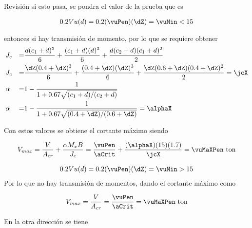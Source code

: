 \documentclass[11pt,a4paper,fleqn]{article}
\begin{document}
 \FPifgt \vuMin \mxZ  {} \else {} \fi
Revisión si esto pasa, se pondra el valor de la prueba que es \pruebaVer
\FPifgt \mxZ \vuMin  
	{
	\begin{align*}
		0.2Vu(d)=0.2(\vuPen)(\dZ)=\vuMin<\mxZ 
	\end{align*}

entonces si hay transmisión de momento, por lo que se requiere obtener 
	\begin{align*}
		&J_c&=&\frac{d(c_1+d)^3}{6}+\frac{(c_1+d)(d)^3}{6}+\frac{d(c_2+d)(c_1+d)^2}{2}\\
		&J_c&=&\frac{\dZ(\caZ+\dZ)^3}{6}+\frac{(\caZ+\dZ)(\dZ)^3}{6}+\frac{\dZ(\cbZ+\dZ)(\caZ+\dZ)^2}{2}=\jcX\\
		&\alpha&=&1-\frac{1}{1+0.67\sqrt{(c_1+d)/(c_2+d)}}\\
		&\alpha&=&1-\frac{1}{1+0.67\sqrt{(\caZ+\dZ)/(\cbZ+\dZ)}}=\alphaX
	\end{align*}
	
	Con estos valores se obtiene el cortante máximo siendo
	
	\begin{align*}
		V_{max}=\frac{V}{A_{cr}}+\frac{\alpha M_x B}{J_c}=\frac{\vuPen}{\aCrit}+\frac{(\alphaX)(\mxZ)(\bZ)}{\jcX}=\vuMaXPen \text{ ton}
	\end{align*}
	} 
\else
	{
	\begin{align*}
		0.2Vu(d)=0.2(\vuPen)(\dZ)=\vuMin>\mxZ 
	\end{align*}
	Por lo que no hay transmisión de momentos, dando el cortante máximo como
	
	
	\begin{align*}
		V_{max}=\frac{V}{A_{cr}}=\frac{\vuPen}{\aCrit}=\vuMaXPen \text{ ton}
	\end{align*}
  }
\fi

En la otra dirección se tiene

\end{document}
